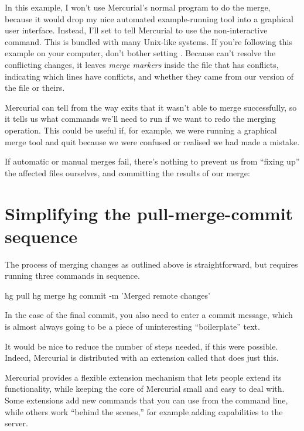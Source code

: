 In this example, I won't use Mercurial's normal 
program to do the merge, because it would drop my nice automated
example-running tool into a graphical user interface.  Instead, I'll
set  to tell Mercurial to use the non-interactive
 command.  This is bundled with many Unix-like systems.
If you're following this example on your computer, don't bother
setting .
Because  can't resolve the conflicting changes, it
leaves \emph{merge markers} inside the file that has conflicts,
indicating which lines have conflicts, and whether they came from our
version of the file or theirs.

Mercurial can tell from the way  exits that it wasn't
able to merge successfully, so it tells us what commands we'll need to
run if we want to redo the merging operation.  This could be useful
if, for example, we were running a graphical merge tool and quit
because we were confused or realised we had made a mistake.

If automatic or manual merges fail, there's nothing to prevent us from
``fixing up'' the affected files ourselves, and committing the results
of our merge:

\section{Simplifying the pull-merge-commit sequence}
\label{sec:tour-merge:fetch}

The process of merging changes as outlined above is straightforward,
but requires running three commands in sequence.
\begin{codesample2}
  hg pull
  hg merge
  hg commit -m 'Merged remote changes'
\end{codesample2}
In the case of the final commit, you also need to enter a commit
message, which is almost always going to be a piece of uninteresting
``boilerplate'' text.

It would be nice to reduce the number of steps needed, if this were
possible.  Indeed, Mercurial is distributed with an extension called
 that does just this.

Mercurial provides a flexible extension mechanism that lets people
extend its functionality, while keeping the core of Mercurial small
and easy to deal with.  Some extensions add new commands that you can
use from the command line, while others work ``behind the scenes,''
for example adding capabilities to the server.

